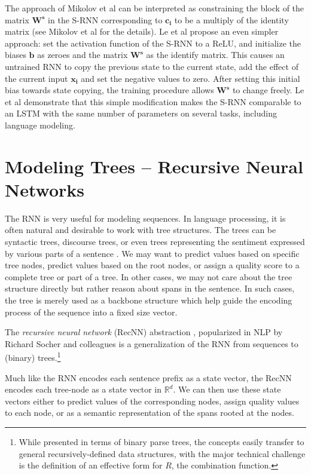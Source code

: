 \documentclass[jair,twoside,11pt,theapa]{article}
\newcommand{\m}[1]{\mathbf{#1}}%
\renewcommand{\shortcite}[0]{\citeyear}
\begin{document}
{The approach of Mikolov et al can be interpreted as constraining the block of the
matrix $\m{W^s}$ in the S-RNN corresponding to $\m{c_i}$ to be a multiply of
the identity matrix (see Mikolov et al \shortcite{mikolov2014learning} for the
details). Le et al \cite{le2015simple} propose an even simpler approach: set
the activation function of the S-RNN to a ReLU, and initialize the biases
$\m{b}$ as zeroes and the matrix
$\m{W^s}$ as the identify matrix.
This causes an untrained RNN to copy the previous state to the current state, add
the effect of the current input $\m{x_i}$ and set the negative values to zero.
After setting this initial bias towards state copying, 
the training procedure allows $\m{W^s}$ to change freely.
Le et al demonstrate that this simple modification makes the S-RNN comparable
to an LSTM with the same number of parameters on several tasks, including
language modeling.

\clearpage
\section{Modeling Trees -- Recursive Neural Networks}
\label{sec:recnn}

The RNN is very useful for modeling sequences. In language
processing, it is often natural and desirable to work with tree structures.
The trees can be syntactic trees, discourse trees, or even trees representing
the sentiment expressed by various parts of a sentence \cite{socher2013recursive}.
We may
want to predict values based on specific tree nodes, predict values based on the
root nodes, or assign a quality score to a complete tree or part of a tree.
In other cases, we may not care about the tree structure directly but rather
reason about spans in the sentence.  In such cases, the tree is merely used as a
backbone structure which help guide the encoding process of the sequence into a
fixed size vector.

The \emph{recursive neural network} (RecNN) abstraction  \cite{pollack1990recursive},
popularized in NLP by
Richard Socher and colleagues
\cite{socher2010learning,socher2011parsing,socher2013parsing,socher2014recursive} is a generalization
of the RNN from sequences to (binary) trees.\footnote{While presented in terms
of binary parse trees, the concepts easily transfer to general recursively-defined data
structures, with the major technical challenge is the definition of an effective
form for $R$, the combination function.}

Much like the RNN encodes each sentence prefix as a state vector, the RecNN encodes
each tree-node as a state vector in $\mathbb{R}^d$.  We can then use these
state vectors either to predict values of the corresponding nodes, assign
quality values to each node, or as a semantic representation of the spans rooted
at the nodes.

}
\end{document}
